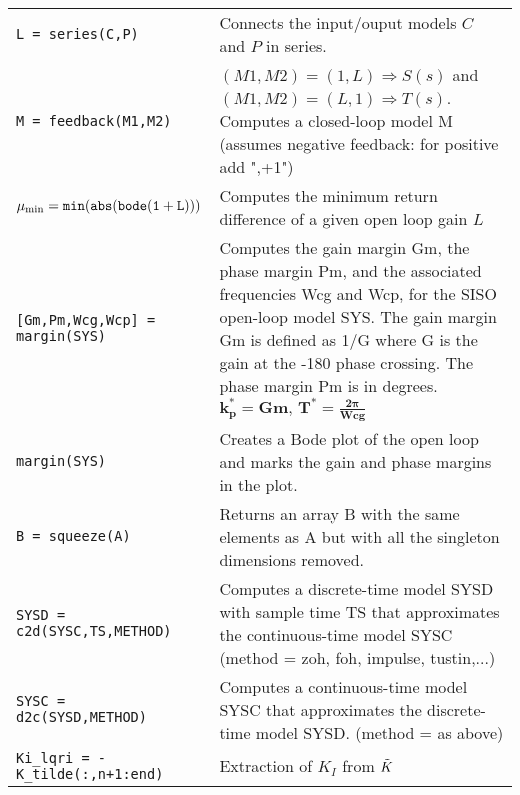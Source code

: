 \begin{center}
\begin{tabular}{p{5cm}|p{8.5cm}}
        \texttt{L = series(C,P)}  & Connects the input/ouput models $C$ and $P$ in series. \\
        
        \texttt{M = feedback(M1,M2)}  & $(M1,M2) = (1,L) \Rightarrow S(s)$ and  $(M1,M2) = (L,1) \Rightarrow T(s)$. Computes a closed-loop model M (assumes negative feedback: for positive add ",+1")\\
        
        $\mathtt{\mu_{\textnormal{min}} = min( abs(bode(1 + L)))}$  &  Computes the minimum return difference of a given open loop gain $L$\\
        
        \texttt{[Gm,Pm,Wcg,Wcp] = margin(SYS)}  & Computes the gain margin Gm, the phase margin Pm, and the associated frequencies Wcg and Wcp, for the SISO open-loop model SYS. The gain margin Gm is defined as 1/G where G is the gain at the -180 phase crossing. The phase margin Pm is in degrees. $\mathbf{k_p^* = Gm, \, T^* = \frac{2\pi}{Wcg}}$\\
        
        \texttt{margin(SYS)} & Creates a Bode plot of the open loop and marks the gain and phase margins in the plot. \\
        
        \texttt{B = squeeze(A)}  &  Returns an array B with the same elements as A but with all the singleton dimensions removed.\\
        
        \texttt{SYSD = c2d(SYSC,TS,METHOD)}  &  Computes a discrete-time model SYSD with sample time TS that approximates the continuous-time model SYSC (method = zoh, foh, impulse, tustin,...)\\
        
        \texttt{SYSC = d2c(SYSD,METHOD)} & Computes a continuous-time model SYSC that approximates the discrete-time model SYSD. (method = as above)\\
        
        \texttt{Ki\_lqri = -K\_tilde(:,n+1:end)} & Extraction of $K_I$ from $\Tilde{K}$
    \end{tabular}
\end{center}


\newpage
